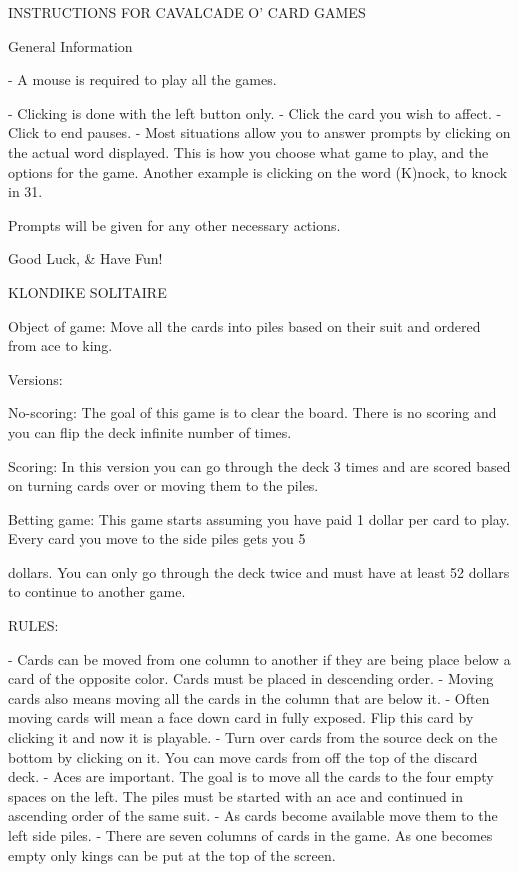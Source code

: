 	INSTRUCTIONS FOR CAVALCADE O' CARD GAMES
 
 
 
General Information

  - A mouse is required to play all the games.
 
  - Clicking is done with the left button only.
  - Click the card you wish to affect.
  - Click to end pauses.
  - Most situations allow you to answer prompts by clicking on the 
actual word displayed.  This is how you choose what game to play,    
and the options for the game.  Another example is clicking on the    
word (K)nock, to knock in 31.

Prompts will be given for any other necessary actions.

			    Good Luck,
				&
			    Have Fun!


KLONDIKE SOLITAIRE

Object of game:
     Move all the cards into piles based on their suit and ordered   
     from ace to king.

Versions:

No-scoring: The goal of this game is to clear the board. There is no 
    scoring and you can flip the deck infinite number of times.

Scoring: In this version you can go through the deck 3 times and are 
    scored based on turning cards over or moving them to the piles.

Betting game: This game starts assuming you have paid 1 dollar per   
    card to play.  Every card you move to the side piles gets you 5  

    dollars. You can only go through the deck twice and must have at 
    least 52 dollars to continue to another game. 
 
RULES:
 
- Cards can be moved from one column to another if they are being
place below a card of the opposite color.  Cards must be placed in
descending order.
- Moving cards also means moving all the cards in the column that are
below it.
- Often moving cards will mean a face down card in fully exposed.
Flip this card by clicking it and now it is playable.
- Turn over cards from the source deck on the bottom by clicking on
it. 
You can move cards from off the top of the discard deck.
- Aces are important.  The goal is to move all the cards to the four
empty spaces on the left.  The piles must be started with an ace and
continued in ascending order of the same suit.
- As cards become available move them to the left side piles.
- There are seven columns of cards in the game. As one becomes empty
only kings can be put at the top of the screen.

